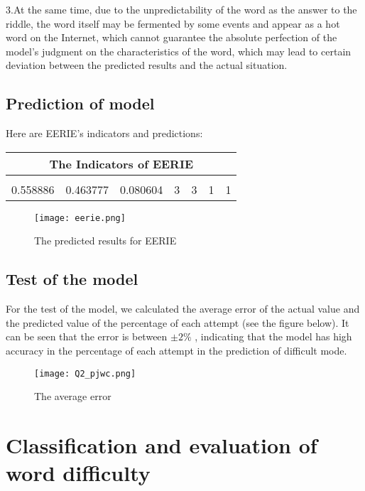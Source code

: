 \documentclass{mcmthesis}
\begin{document}
3.At the same time, due to the unpredictability of the word as the answer to the riddle, the word itself may be fermented by some events and appear as a hot word on the Internet, which cannot guarantee the absolute perfection of the model's judgment on the characteristics of the word, which may lead to certain deviation between the predicted results and the actual situation.

\subsection{Prediction of model}
Here are EERIE's indicators and predictions:
\begin{table}[H]
	\centering
	\begin{tabular}{ccccccc}
		\toprule[1.5pt]
		\multicolumn{7}{c}{The Indicators of EERIE} \\  \midrule[1.5pt]
		 \makebox[0.1\textwidth][c]{E} 
		& \makebox[0.1\textwidth][c]{P} & \makebox[0.1\textwidth][c]{F} 
		& \makebox[0.1\textwidth][c]{C} & \makebox[0.1\textwidth][c]{$L_e$} 
		& \makebox[0.1\textwidth][c]{$L_i$} & \makebox[0.1\textwidth][c]{$L_r$}\\
		0.558886 & 0.463777 &	0.080604 &	3 &	3 &	1 &	1    \\  \bottomrule[1.5pt]
	\end{tabular}
\end{table}

\begin{figure}[H]
	\centering
	\texttt{[image: eerie.png]}
	\caption{\small The predicted results for EERIE }
\end{figure}

\subsection{Test of the model}
For the test of the model, we calculated the average error of the actual value and the predicted value of the percentage of each attempt (see the figure below). It can be seen that the error is between $\pm 2\%$ , indicating that the model has high accuracy in the percentage of each attempt in the prediction of difficult mode.
\begin{figure}[H]
	\centering
	\texttt{[image: Q2\_pjwc.png]}
	\caption{\small The average error}
\end{figure}

\section{Classification and evaluation of word difficulty}
\end{document}

